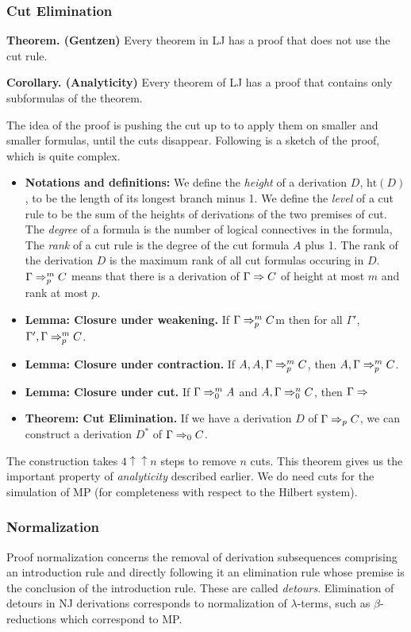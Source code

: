 \subsubsection{Cut Elimination}

\textbf{Theorem. (Gentzen)} Every theorem in LJ has a proof that does not use the cut rule.

\textbf{Corollary. (Analyticity)} Every theorem of LJ has a proof that contains only
subformulas of the theorem.

The idea of the proof is pushing the cut up to to apply them on smaller and smaller formulas,
until the cuts disappear. Following is a sketch of the proof, which is quite complex.
\begin{itemize}
\item \textbf{Notations and definitions:} We define the \emph{height} of a derivation $D$, 
$\mathrm{ht}(D)$, to be the length of its longest branch minus 1. We define the \emph{level} of a 
cut rule to be the sum of the heights of derivations of the two premises of cut. The \emph{degree} of 
a formula is the number of logical connectives in the formula, The \emph{rank} of a cut rule is the degree
of the cut formula $A$ plus 1. The rank of the derivation $D$ is the maximum rank of
all cut formulas occuring in $D$. $\Gamma \Rightarrow_p^m C$ means that there is a derivation of $\Gamma \Rightarrow C$
of height at most $m$ and rank at most $p$.
\item \textbf{Lemma: Closure under weakening.} If $\Gamma \Rightarrow_p^m C$m then for all $\Gamma'$, $\Gamma', \Gamma \Rightarrow_p^m C$.
\item \textbf{Lemma: Closure under contraction.} If $A, A, \Gamma \Rightarrow_p^m C$, then $A, \Gamma \Rightarrow_p^m C$.
\item \textbf{Lemma: Closure under cut.} If $\Gamma \Rightarrow_0^m A$ and $A, \Gamma \Rightarrow_0^n C$, then $\Gamma \Rightarrow$ 
\item \textbf{Theorem: Cut Elimination.} If we have a derivation $D$ of $\Gamma \Rightarrow_p C$, we
can construct a derivation $D^*$ of $\Gamma \Rightarrow_0 C$.
\end{itemize}

The construction takes $4 \uparrow \uparrow n$ steps to remove $n$ cuts.
This theorem gives us the important property of \emph{analyticity} described earlier. We do need cuts
for the simulation of MP (for completeness with respect to the Hilbert system).

\subsubsection{Normalization}
Proof normalization concerns the removal of derivation subsequences comprising an introduction rule
and directly following it an elimination rule whose premise is the conclusion of the introduction rule.
These are called \emph{detours}. Elimination of detours in NJ derivations corresponds
to normalization of $\lambda$-terms, such as $\beta$-reductions which correspond to MP.

